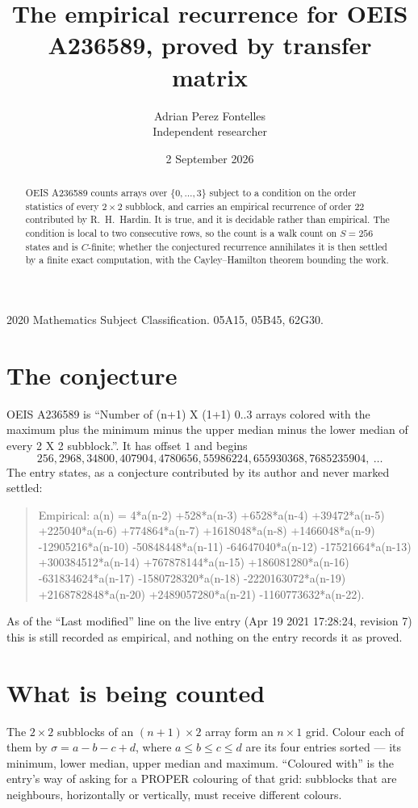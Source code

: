 \documentclass[11pt,a4paper]{article}
\title{The empirical recurrence for OEIS A236589, proved by transfer matrix}
\author{Adrian Perez Fontelles\\ \small Independent researcher}
\date{2 September 2026}
\theoremstyle{plain}
\theoremstyle{definition}
\begin{document}
\maketitle

\begin{abstract}
OEIS A236589 counts arrays over $\{0,\dots,3\}$ subject to a condition on the order
statistics of every $2\times2$ subblock, and carries an empirical recurrence of order
$22$ contributed by R.~H.~Hardin. It is true, and it is decidable rather than empirical.
The condition is local to two consecutive rows, so the count is a walk count on $S=256$
states and is $C$-finite; whether the conjectured recurrence annihilates it is then settled by
a finite exact computation, with the Cayley--Hamilton theorem bounding the work.
\end{abstract}

\noindent\small 2020 Mathematics Subject Classification. 05A15, 05B45, 62G30.\normalsize

\section{The conjecture}

OEIS A236589 is ``Number of (n+1) X (1+1) 0..3 arrays colored with the maximum plus the minimum minus the upper median minus the lower median of every 2 X 2 subblock.''. It has offset $1$ and begins
\[
256, 2968, 34800, 407904, 4780656, 55986224, 655930368, 7685235904,\ \dots
\]
The entry states, as a conjecture contributed by its author and never marked settled:
\begin{quote}
Empirical: a(n) = 4*a(n-2) +528*a(n-3) +6528*a(n-4) +39472*a(n-5) +225040*a(n-6) +774864*a(n-7) +1618048*a(n-8) +1466048*a(n-9) -12905216*a(n-10) -50848448*a(n-11) -64647040*a(n-12) -17521664*a(n-13) +300384512*a(n-14) +767878144*a(n-15) +186081280*a(n-16) -631834624*a(n-17) -1580728320*a(n-18) -2220163072*a(n-19) +2168782848*a(n-20) +2489057280*a(n-21) -1160773632*a(n-22).
\end{quote}
As of the ``Last modified'' line on the live entry (Apr 19 2021 17:28:24, revision 7) this is still
recorded as empirical, and nothing on the entry records it as proved.

\section{What is being counted}

The $2\times2$ subblocks of an $(n+1)\times2$ array form an
$n\times1$ grid. Colour each of them by $\sigma=a-b-c+d$, where $a\le b\le c\le d$ are its four entries sorted --- its minimum, lower median, upper median and maximum. ``Coloured with'' is the entry's way of
asking for a PROPER colouring of that grid: subblocks that are neighbours, horizontally or
vertically, must receive different colours.
\end{document}
